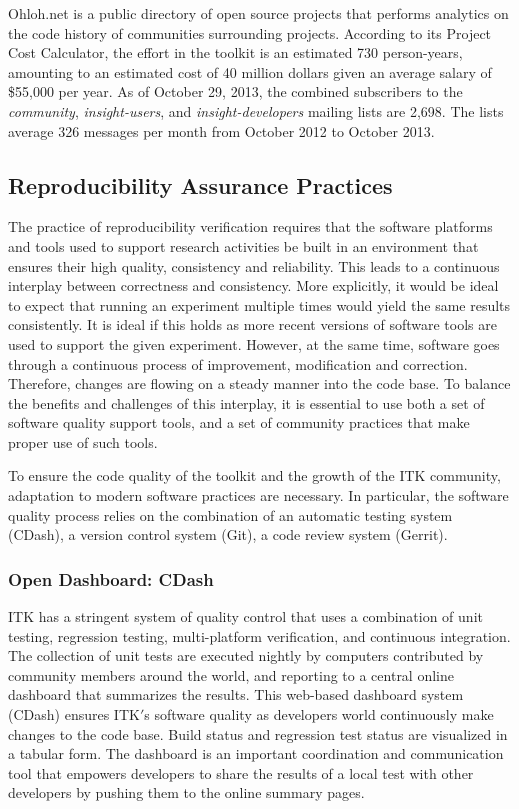 \documentclass{frontiersENG} %
\begin{document}
Ohloh.net \cite{OhlohITK2013} is a public directory of open source projects
that performs analytics on the code history of communities surrounding
projects. According to its Project Cost Calculator, the effort in the toolkit
is an estimated 730 person-years, amounting to an estimated cost of 40 million
dollars given an average salary of \$55,000 per year.  As of October 29, 2013,
the combined subscribers to the \textit{community}, \textit{insight-users}, and
\textit{insight-developers} mailing lists are 2,698.  The lists average 326
messages per month from October 2012 to October 2013.


\subsection{Reproducibility Assurance Practices}

The practice of reproducibility verification requires that the software
platforms and tools used to support research activities be built in an
environment that ensures their high quality, consistency and reliability. This
leads to a continuous interplay between correctness and consistency. More
explicitly, it would be ideal to expect that running an experiment multiple times
would yield the same results consistently. It is ideal if this holds as more
recent versions of software tools are used to support the given experiment.
However, at the same time, software goes through a continuous process of
improvement, modification and correction. Therefore, changes are flowing on a
steady manner into the code base. To balance the benefits and challenges of
this interplay, it is essential to use both a set of software quality support
tools, and a set of community practices that make proper use of such tools.

To ensure the code quality of the toolkit and the growth of the ITK community,
adaptation to modern software practices are necessary. In particular, the
software quality process relies on the combination of an automatic
testing system (CDash), a version control system (Git), a code review system
(Gerrit).

\subsubsection{Open Dashboard: CDash}

ITK has a stringent system of quality control that uses a combination of unit
testing, regression testing, multi-platform verification, and continuous
integration. The collection of unit tests are executed nightly by computers
contributed by community members around the world, and reporting to a
central online dashboard that summarizes the results. This web-based dashboard
system (CDash) \cite{ITKDashboard} ensures ITK$'$s software quality as
developers world continuously make changes to the code base. Build
status and regression test status are visualized in a tabular form. The
dashboard is an important coordination and communication tool that empowers
developers to share the results of a local test with other developers by
pushing them to the online summary pages.
\end{document}
